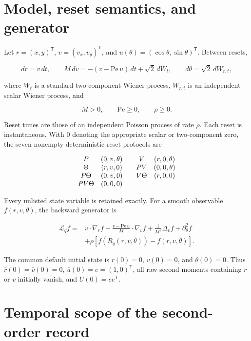 \section{Model, reset semantics, and generator}\label{s1.-model-reset-semantics-and-generator}

Let \(r=(x,y)^\mathsf T\), \(v=(v_x,v_y)^\mathsf T\), and \(u(\theta)=(\cos\theta,\sin\theta)^\mathsf T\). Between resets,

\[
dr=v\,dt,\qquad
M\,dv=-(v-\mathrm{Pe}\,u)\,dt+\sqrt{2}\,dW_t,\qquad
d\theta=\sqrt{2}\,dW_{r,t},
\]

where \(W_t\) is a standard two-component Wiener process, \(W_{r,t}\) is an independent scalar Wiener process, and

\[
M>0,\qquad \mathrm{Pe}\ge 0,\qquad \rho\ge 0.
\]

Reset times are those of an independent Poisson process of rate \(\rho\). Each reset is instantaneous. With \(0\) denoting the appropriate scalar or two-component zero, the seven nonempty deterministic reset protocols are

\[
\begin{array}{c@{\quad}c@{\qquad}c@{\quad}c}
P&(0,v,\theta)&V&(r,0,\theta)\\
\Theta&(r,v,0)&PV&(0,0,\theta)\\
P\Theta&(0,v,0)&V\Theta&(r,0,0)\\
PV\Theta&(0,0,0)&&
\end{array}
\]

Every unlisted state variable is retained exactly. For a smooth observable \(f(r,v,\theta)\), the backward generator is

\[
\boxed{
\begin{aligned}
\mathcal L_q f
={}&v\mathbin{\cdot}\nabla_r f
-\frac{v-\mathrm{Pe}\,u}{M}\mathbin{\cdot}\nabla_v f
+\frac{1}{M^2}\Delta_v f+\partial_\theta^2 f\\
&+\rho\left[f(R_q(r,v,\theta))-f(r,v,\theta)\right].
\end{aligned}}
\]

The common default initial state is \(r(0)=0\), \(v(0)=0\), and \(\theta(0)=0\). Thus \(\bar r(0)=\bar v(0)=0\), \(\bar u(0)=e=(1,0)^\mathsf T\), all raw second moments containing \(r\) or \(v\) initially vanish, and \(U(0)=ee^\mathsf T\).



\section{Temporal scope of the second-order record}\label{s2.-temporal-scope-of-the-second-order-record}


